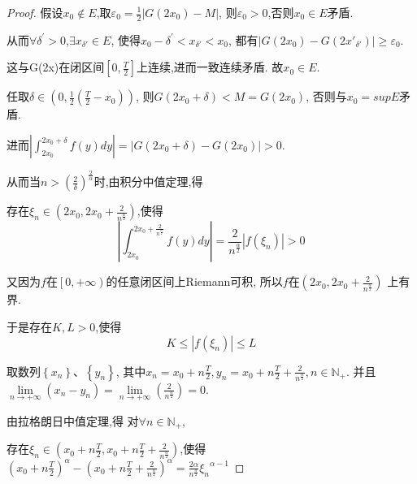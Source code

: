 \documentclass[lang=cn,newtx,10pt,scheme=chinese]{../Template/elegantbook}
\begin{document}
\begin{proof}
假设$x_0\notin E$,取$\varepsilon _0=\frac{1}{2}\left| G\left( 2x_0 \right) -M \right|$,
则$\varepsilon _0>0$,否则$x_0\in E$矛盾.

从而$\forall \delta ^{\prime}>0$,$\exists x_{\delta'}\in E$,
使得$ x_0-\delta ^{\prime}<x_{\delta'}<x_0$,
都有$\left| G\left( 2x_0 \right) -G\left( 2x'_{\delta'} \right) \right|\geqslant \varepsilon _0$.

这与G(2x)在闭区间$\left[ 0,\frac{T}{2} \right]$上连续,进而一致连续矛盾.
故$x_0\in E$.

任取$\delta \in \left( 0,\frac{1}{2}\left( \frac{T}{2}-x_0 \right) \right) $,
则$G\left( 2x_0+\delta \right) <M=G\left( 2x_0 \right) $,
否则与$x_0=supE$矛盾.

进而$\left| \int_{2x_0}^{2x_0+\delta}{f\left( y \right) dy} \right|=\left| G\left( 2x_0+\delta \right) -G\left( 2x_0 \right) \right|>0$.

从而当$n>\left( \frac{2}{\delta} \right) ^{\frac{2}{\alpha}}$时,由积分中值定理,得

存在$\xi _n\in \left( 2x_0,2x_0+\frac{2}{n^{\frac{\alpha}{2}}} \right) $,使得
\begin{equation}\label{A}
\left| \int_{2x_0}^{2x_0+\frac{2}{n^{\frac{\alpha}{2}}}}{f\left( y \right) dy} \right|=\frac{2}{n^{\frac{\alpha}{2}}}\left| f\left( \xi _n \right) \right|>0
\end{equation}

又因为$f$在$\left[ 0,+\infty \right)$的任意闭区间上Riemann可积,
所以$f$在$\left( 2x_0,2x_0+\frac{2}{n^{\frac{\alpha}{2}}} \right) $
上有界.

于是存在$K,L> 0$,使得
\begin{equation}\label{B}
K\leqslant \left| f\left( \xi _n \right) \right|\leqslant L
\end{equation}

取数列$\left\{ x_n \right\} \text{、}\left\{ y_n \right\} $,
其中$x_n=x_0+n\frac{T}{2},y_n=x_0+n\frac{T}{2}+\frac{2}{n^{\frac{\alpha}{2}}},n\in \mathbb{N} _+$.
并且$\underset{n\rightarrow +\infty}{\lim}\left( x_n-y_n \right) =\underset{n\rightarrow +\infty}{\lim}\left( \frac{2}{n^{\frac{\alpha}{2}}} \right) =0$.

由拉格朗日中值定理,得
对$\forall n\in \mathbb{N} _+$,

存在$\xi _n\in \left( x_0+n\frac{T}{2},x_0+n\frac{T}{2}+\frac{2}{n^{\frac{\alpha}{2}}} \right) $,使得
$\left( x_0+n\frac{T}{2} \right) ^{\alpha}-\left( x_0+n\frac{T}{2}+\frac{2}{n^{\frac{\alpha}{2}}} \right) ^{\alpha}=\frac{2\alpha}{n^{\frac{\alpha}{2}}}{\xi _n}^{\alpha -1}$


\end{proof}
\end{document}
